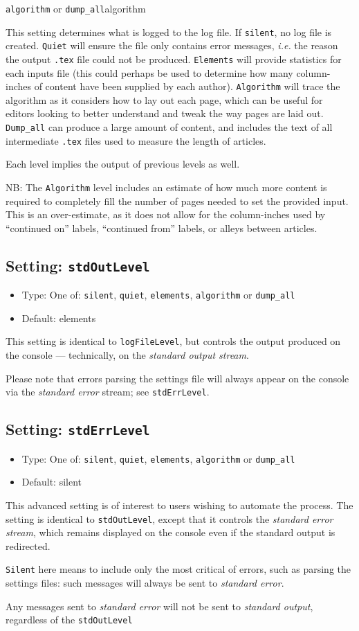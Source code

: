 \documentclass[a4paper,DIV=11]{scrartcl}
\newcommand{\property}[5]{
  \subsection{#1: \texttt{#2}}
  \begin{itemize}
  \item Type: #3
  \item Default: #4
  \end{itemize}
  #5
}
\newcommand{\setting}{\property{Setting}}
\begin{document}
\begin{multicols}{2}
{  \texttt{algorithm} or \texttt{dump\_all}}{algorithm}{
  This setting determines what is logged to the log file. If
  \texttt{silent}, no log file is created. \texttt{Quiet} will ensure
  the file only contains error messages, \textit{i.e.} the reason the
  output \texttt{.tex} file could not be produced. \texttt{Elements}
  will provide statistics for each inputs file (this could perhaps be used to
  determine how many column-inches of content have been supplied by
  each author). \texttt{Algorithm} will trace the algorithm as it
  considers how to lay out each page, which can be useful for editors
  looking to better understand and tweak the
  way pages are laid out. \texttt{Dump\_all} can produce a large amount of content,
  and includes the text of all intermediate \texttt{.tex} files used
  to measure the length of articles.
  \par
  Each level implies the output of previous levels as well.
  \par
  NB: The \texttt{Algorithm} level includes an estimate of how much
  more content is required to completely fill the number of pages
  needed to set the provided input. This is an over-estimate, as
  it does not allow for the column-inches used by ``continued on'' labels,
  ``continued from'' labels, or alleys between articles.
}
\setting{stdOutLevel}{One of: \texttt{silent}, \texttt{quiet}, \texttt{elements},
  \texttt{algorithm} or \texttt{dump\_all}}{elements}{
  This setting is identical to \texttt{logFileLevel}, but controls the
  output produced on the console --- technically, on the
  \textit{standard output stream}.\par Please note that errors parsing
  the settings file will always appear on the console via the
  \textit{standard error} stream; see \texttt{stdErrLevel}.
}
\setting{stdErrLevel}{One of: \texttt{silent}, \texttt{quiet}, \texttt{elements},
  \texttt{algorithm} or \texttt{dump\_all}}{silent}{
  This advanced setting is of interest to users wishing to automate
  the process. The setting is identical to \texttt{stdOutLevel},
  except that it controls the \textit{standard error stream}, which
  remains displayed on the console even if the standard output is
  redirected.\par
  \texttt{Silent} here means to include only the most critical of
  errors, such as parsing the settings files: such messages will
  always be sent to \textit{standard error}. \par
  Any messages sent to \textit{standard error} will not be sent to
  \textit{standard output}, regardless of the \texttt{stdOutLevel}
}
\end{multicols}
\end{document}
